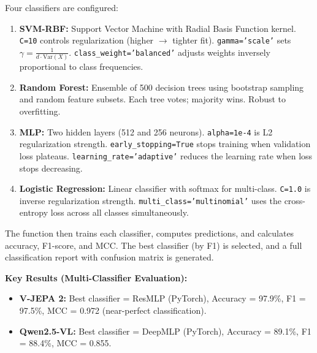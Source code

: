 \begin{explanation}
Four classifiers are configured:

\begin{enumerate}[nosep]
  \item \textbf{SVM-RBF:} Support Vector Machine with Radial Basis Function kernel. \texttt{C=10} controls regularization (higher $\to$ tighter fit). \texttt{gamma='scale'} sets $\gamma = \frac{1}{d \cdot \text{Var}(X)}$. \texttt{class\_weight='balanced'} adjusts weights inversely proportional to class frequencies.

  \item \textbf{Random Forest:} Ensemble of 500 decision trees using bootstrap sampling and random feature subsets. Each tree votes; majority wins. Robust to overfitting.

  \item \textbf{MLP:} Two hidden layers (512 and 256 neurons). \texttt{alpha=1e-4} is L2 regularization strength. \texttt{early\_stopping=True} stops training when validation loss plateaus. \texttt{learning\_rate='adaptive'} reduces the learning rate when loss stops decreasing.

  \item \textbf{Logistic Regression:} Linear classifier with softmax for multi-class. \texttt{C=1.0} is inverse regularization strength. \texttt{multi\_class='multinomial'} uses the cross-entropy loss across all classes simultaneously.
\end{enumerate}
\end{explanation}

The function then trains each classifier, computes predictions, and calculates accuracy, F1-score, and MCC. The best classifier (by F1) is selected, and a full classification report with confusion matrix is generated.

\textbf{Key Results (Multi-Classifier Evaluation):}
\begin{itemize}[nosep]
  \item \textbf{V-JEPA 2:} Best classifier = ResMLP (PyTorch), Accuracy = 97.9\%, F1 = 97.5\%, MCC = 0.972 (near-perfect classification).
  \item \textbf{Qwen2.5-VL:} Best classifier = DeepMLP (PyTorch), Accuracy = 89.1\%, F1 = 88.4\%, MCC = 0.855.
\end{itemize}

\newpage
